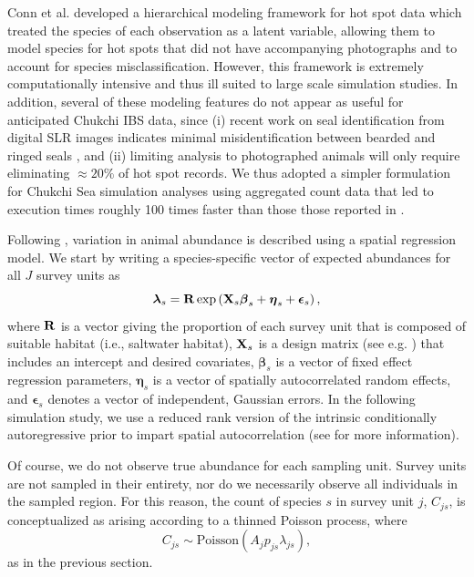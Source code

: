 \documentclass[]{rsos}%
\begin{document}
{Conn et al. \cite{ConnEtAl2014} developed a hierarchical modeling framework for hot spot data which treated the species of each observation as a latent variable, allowing them to model species for hot spots that did not have accompanying photographs and to account for species misclassification.  However, this framework is extremely computationally intensive and thus ill suited to large scale simulation studies. In addition, several of these modeling features do not appear as useful for anticipated Chukchi IBS data, since (i) recent work on seal identification from digital SLR images indicates minimal misidentification between bearded and ringed seals \cite{McClintockEtAlInPress}, and (ii) limiting analysis to photographed animals will only require eliminating $\approx 20\%$ of hot spot records.  We thus adopted a simpler formulation for Chukchi Sea simulation analyses using aggregated count data that led to execution times roughly 100 times faster than those those reported in \cite{ConnEtAl2014}.

Following \cite{ConnEtAl2014}, variation in animal abundance is described using a spatial regression model.  We start by writing a species-specific vector of expected abundances for all $J$ survey units as
\begin{equation*}
  \boldsymbol{\lambda}_s = {\bf R} \exp \left( {\bf X}_s \boldsymbol{\beta}_s + \boldsymbol{\eta}_s + \boldsymbol{\epsilon}_s \right),
\end{equation*}
where ${\bf R}$ is a vector giving the proportion of each survey unit that is composed of suitable habitat (i.e., saltwater habitat), ${\bf X}_s$ is a design matrix (see e.g. \cite{Draper1966}) that includes an intercept and desired covariates, $\boldsymbol{\beta}_s$ is a vector of fixed effect regression parameters, $\boldsymbol{\eta}_s$ is a vector of spatially autocorrelated random effects, and $\boldsymbol{\epsilon}_s$ denotes a vector of independent, Gaussian errors.  In the following simulation study, we use a reduced rank version of the intrinsic conditionally autoregressive prior \cite{RueHeld2005} to impart spatial autocorrelation (see \cite{ConnEtAl2014} for more information).

Of course, we do not observe true abundance for each sampling unit. Survey units are not sampled in their entirety, nor do we necessarily observe all individuals in the sampled region.  For this reason, the count of species $s$ in survey unit $j$, $C_{js}$, is conceptualized as arising according to a thinned Poisson process, where
\begin{equation*}
 C_{js} \sim \textrm{Poisson}(A_j p_{js} \lambda_{js}),
\end{equation*}
as in the previous section.

}
\end{document}
